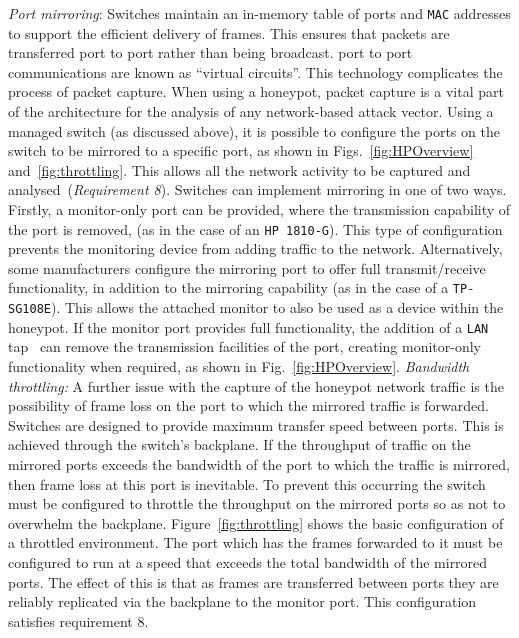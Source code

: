 \documentclass{ieeeaccess}
\begin{document}
\noindent\emph{Port mirroring}:
Switches maintain an in-memory table of ports and \texttt{MAC} addresses to
support the efficient delivery of frames. This ensures that packets are transferred port to port rather than being broadcast. port to port communications are known as ``virtual circuits''. This
technology complicates the process of packet capture. When using a honeypot, packet
capture is a vital part of the architecture for the analysis of any
network-based attack vector. Using a managed switch (as discussed above), it is
possible to configure the ports on the switch to be mirrored to a specific
port, as shown in Figs.~\ref{fig:HPOverview} and~\ref{fig:throttling}. This
allows all the network activity to be captured and analysed~(\emph{Requirement
8}). Switches can implement mirroring in one of two ways. Firstly, a monitor-only
port can be provided, where the transmission capability of the port is removed,
(as in the case of an \texttt{HP 1810-G}). This type of configuration prevents the
monitoring device from adding traffic to the network. Alternatively, some
manufacturers configure the mirroring port to offer full transmit/receive
functionality, in addition to the mirroring capability (as in the case of a
\texttt{TP-SG108E}). This allows the attached monitor to also be used as a device within
the honeypot. If the monitor port provides full functionality, the addition of
a \texttt{LAN} tap~\cite{RB:13} can remove the transmission facilities of the port,
creating monitor-only functionality when required, as shown in
Fig.~\ref{fig:HPOverview}.
\newline\newline
\noindent\emph{Bandwidth throttling:}
A further issue with the capture of the honeypot network traffic is the
possibility of frame loss on the port to which the mirrored traffic is
forwarded.  Switches are designed to provide maximum transfer speed between
ports. This is achieved through the switch's backplane. If the throughput of
traffic on the mirrored ports exceeds the bandwidth of the port to which the
traffic is mirrored, then frame loss at this port is inevitable. To prevent
this occurring the switch must be configured to throttle the throughput on the
mirrored ports so as not to overwhelm the backplane.
Figure~\ref{fig:throttling} shows the basic configuration of a throttled
environment. The port which has the frames forwarded to it must be configured
to run at a speed that exceeds the total bandwidth of the mirrored ports. The
effect of this is that as frames are transferred between ports they are
reliably replicated via the backplane to the monitor port. This configuration
satisfies requirement 8.
\end{document}
